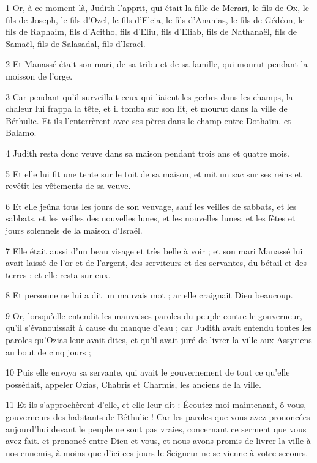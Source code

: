 \par 1 Or, à ce moment-là, Judith l'apprit, qui était la fille de Merari, le fils de Ox, le fils de Joseph, le fils d'Ozel, le fils d'Elcia, le fils d'Ananias, le fils de Gédéon, le fils de Raphaim, fils d'Acitho, fils d'Eliu, fils d'Eliab, fils de Nathanaël, fils de Samaël, fils de Salasadal, fils d'Israël.
\par 2 Et Manassé était son mari, de sa tribu et de sa famille, qui mourut pendant la moisson de l'orge.
\par 3 Car pendant qu'il surveillait ceux qui liaient les gerbes dans les champs, la chaleur lui frappa la tête, et il tomba sur son lit, et mourut dans la ville de Béthulie. Et ils l'enterrèrent avec ses pères dans le champ entre Dothaïm. et Balamo.
\par 4 Judith resta donc veuve dans sa maison pendant trois ans et quatre mois.
\par 5 Et elle lui fit une tente sur le toit de sa maison, et mit un sac sur ses reins et revêtit les vêtements de sa veuve.
\par 6 Et elle jeûna tous les jours de son veuvage, sauf les veilles de sabbats, et les sabbats, et les veilles des nouvelles lunes, et les nouvelles lunes, et les fêtes et jours solennels de la maison d'Israël.
\par 7 Elle était aussi d'un beau visage et très belle à voir ; et son mari Manassé lui avait laissé de l'or et de l'argent, des serviteurs et des servantes, du bétail et des terres ; et elle resta sur eux.
\par 8 Et personne ne lui a dit un mauvais mot ; ar elle craignait Dieu beaucoup.
\par 9 Or, lorsqu'elle entendit les mauvaises paroles du peuple contre le gouverneur, qu'il s'évanouissait à cause du manque d'eau ; car Judith avait entendu toutes les paroles qu'Ozias leur avait dites, et qu'il avait juré de livrer la ville aux Assyriens au bout de cinq jours ;
\par 10 Puis elle envoya sa servante, qui avait le gouvernement de tout ce qu'elle possédait, appeler Ozias, Chabris et Charmis, les anciens de la ville.
\par 11 Et ils s'approchèrent d'elle, et elle leur dit : Écoutez-moi maintenant, ô vous, gouverneurs des habitants de Béthulie ! Car les paroles que vous avez prononcées aujourd'hui devant le peuple ne sont pas vraies, concernant ce serment que vous avez fait. et prononcé entre Dieu et vous, et nous avons promis de livrer la ville à nos ennemis, à moins que d'ici ces jours le Seigneur ne se vienne à votre secours.
